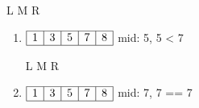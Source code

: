 \documentclass[12pt, letterpaper]{article}
\begin{document}
\begin{minipage}{0.8\textwidth}
	\hspace{1.2cm}L
	\hspace{0.7cm}M
	\hspace{0.6cm}R
	\begin{enumerate}
		\item 
		$\begin{array}{|l|c|c|c|r|}
			\hline
			1 & 3 & 5 & 7 & 8 \\
			\hline
		\end{array}$
		mid: 5, 5 < 7
		
		\hspace{1.2cm}L
		\hspace{0.2cm}M
		\hspace{0.2cm}R
		
		\item 
		$\begin{array}{|l|c|c|c|c|r|}
			\hline
			1 & 3 & 5 & 7 & 8 \\
			\hline
		\end{array}$
		mid: 7, 7 == 7
	\end{enumerate}
\end{minipage}
\end{document}
